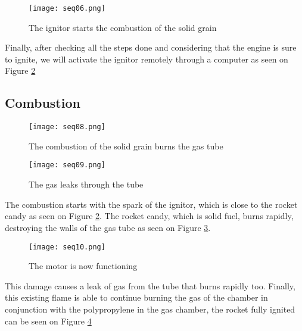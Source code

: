\begin{figure}[h]
  \centering
  \texttt{[image: seq06.png]}
  \caption{The ignitor starts the combustion of the solid grain}
  \label{fig:startSolidBurnMotor}
\end{figure}

Finally, after checking all the steps done and considering that the engine is sure to ignite, we will activate the ignitor remotely through a computer as seen on Figure \ref{fig:solidBurningMotor}

\subsection*{Combustion}

\begin{figure}[h]
  \centering
  \texttt{[image: seq08.png]}
  \caption{The combustion of the solid grain burns the gas tube}
  \label{fig:solidBurningMotor}
\end{figure}

\begin{figure}[h]
  \centering
  \texttt{[image: seq09.png]}
  \caption{The gas leaks through the tube}
  \label{fig:gasLeakingMotor}
\end{figure}

The combustion starts with the spark of the ignitor, which is close to the rocket candy as seen on Figure \ref{fig:solidBurningMotor}. The rocket candy, which is solid fuel, burns rapidly, destroying the walls of the gas tube as seen on Figure \ref{fig:gasLeakingMotor}.

\begin{figure}[H]
  \centering
  \texttt{[image: seq10.png]}
  \caption{The motor is now functioning}
  \label{fig:functioningMotor}
\end{figure}

This damage causes a leak of gas from the tube that burns rapidly too. Finally, this existing flame is able to continue burning the gas of the chamber in conjunction with the polypropylene in the gas chamber, the rocket fully ignited can be seen on Figure \ref{fig:functioningMotor}
